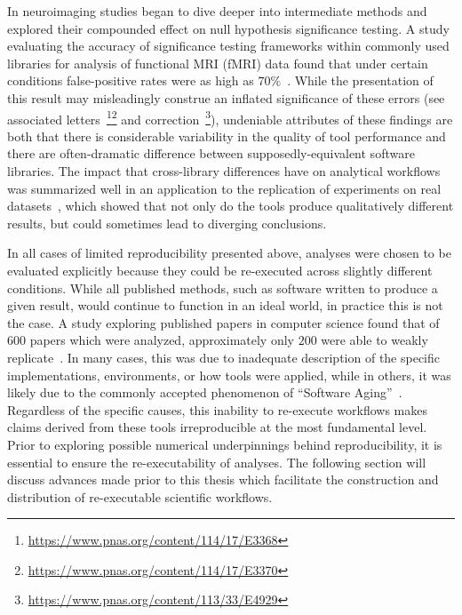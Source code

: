 In neuroimaging studies began to dive deeper into intermediate methods and explored their compounded effect on null
hypothesis significance testing. A study evaluating the accuracy of significance testing frameworks within commonly
used libraries for analysis of functional MRI (fMRI) data found that under certain conditions false-positive rates were
as high as $70\%$~\cite{eklund2016cluster}. While the presentation of this result may misleadingly construe an inflated
significance of these errors (see associated
letters~\footnote{\url{https://www.pnas.org/content/114/17/E3368}}\footnote{\url{https://www.pnas.org/content/114/17/E3370}}
and correction~\footnote{\url{https://www.pnas.org/content/113/33/E4929}}), undeniable attributes of these findings are
both that there is considerable variability in the quality of tool performance and there are often-dramatic difference
between supposedly-equivalent software libraries. The impact that cross-library differences have on analytical
workflows was summarized well in an application to the replication of experiments on real
datasets~\cite{bowring2019exploring}, which showed that not only do the tools produce qualitatively different results,
but could sometimes lead to diverging conclusions.

In all cases of limited reproducibility presented above, analyses were chosen to be evaluated explicitly because they
could be re-executed across slightly different conditions.  While all published methods, such as software written to
produce a given result, would continue to function in an ideal world, in practice this is not the case. A study
exploring published papers in computer science found that of $600$ papers which were analyzed, approximately only $200$
were able to weakly replicate~\cite{collberg2016repeatability}. In many cases, this was due to inadequate description
of the specific implementations, environments, or how tools were applied, while in others, it was likely due to the
commonly accepted phenomenon of ``Software Aging''~\cite{parnas1994software}. Regardless of the specific causes, this
inability to re-execute workflows makes claims derived from these tools irreproducible at the most fundamental level.
Prior to exploring possible numerical underpinnings behind reproducibility, it is essential to ensure the
re-executability of analyses. The following section will discuss advances made prior to this thesis which facilitate
the construction and distribution of re-executable scientific workflows.

